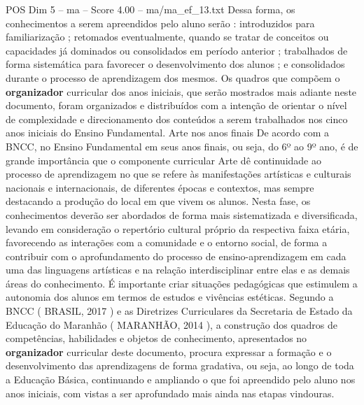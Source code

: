\begin{textsample}{POS Dim 5 – ma – Score 4.00 – ma/ma\_ef\_13.txt}
Dessa forma, os conhecimentos a serem apreendidos pelo aluno serão : introduzidos para familiarização ; retomados eventualmente, quando se tratar de conceitos ou capacidades já dominados ou consolidados em período anterior ; trabalhados de forma sistemática para favorecer o desenvolvimento dos alunos ; e consolidados durante o processo de aprendizagem dos mesmos.
Os quadros que compõem o \textbf{organizador} curricular dos anos iniciais, que serão mostrados mais adiante neste documento, foram organizados e distribuídos com a intenção de orientar o nível de complexidade e direcionamento dos conteúdos a serem trabalhados nos cinco anos iniciais do Ensino Fundamental.
Arte nos anos finais De acordo com a BNCC, no Ensino Fundamental em seus anos finais, ou seja, do 6º ao 9º ano, é de grande importância que o componente curricular Arte dê continuidade ao processo de aprendizagem no que se refere às manifestações artísticas e culturais nacionais e internacionais, de diferentes épocas e contextos, mas sempre destacando a produção do local em que vivem os alunos.
Nesta fase, os conhecimentos deverão ser abordados de forma mais sistematizada e diversificada, levando em consideração o repertório cultural próprio da respectiva faixa etária, favorecendo as interações com a comunidade e o entorno social, de forma a contribuir com o aprofundamento do processo de ensino-aprendizagem em cada uma das linguagens artísticas e na relação interdisciplinar entre elas e as demais áreas do conhecimento.
É importante criar situações pedagógicas que estimulem a autonomia dos alunos em termos de estudos e vivências estéticas.
Segundo a BNCC ( BRASIL, 2017 ) e as Diretrizes Curriculares da Secretaria de Estado da Educação do Maranhão ( MARANHÃO, 2014 ), a construção dos quadros de competências, habilidades e objetos de conhecimento, apresentados no \textbf{organizador} curricular deste documento, procura expressar a formação e o desenvolvimento das aprendizagens de forma gradativa, ou seja, ao longo de toda a Educação Básica, continuando e ampliando o que foi apreendido pelo aluno nos anos iniciais, com vistas a ser aprofundado mais ainda nas etapas vindouras.

\end{textsample}
